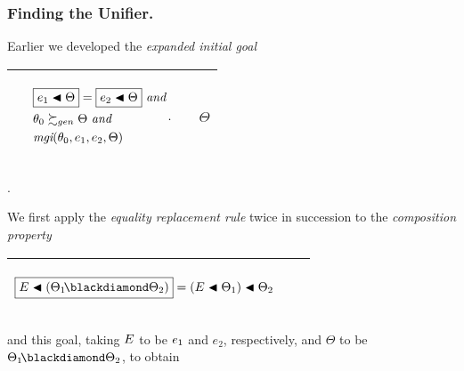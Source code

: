 \documentclass[runningheads]{llncs}
\DeclareMathOperator{\uand}{\emph{and}\,}
\DeclareMathOperator{\mgi}{\emph{mgi}}
\begin{document}
\subsubsection{Finding the Unifier.} Earlier we developed the \emph{expanded initial goal}
\begin{center}
\begin{tabular}{|m{}|m{}||m{}|}
 \hline 
  & 
  \begin{center}
${\begin{aligned} 
&\begin{aligned}
&\boxed{\e{1} \apply \Theta} = \boxed{\e{2} \apply \Theta} \, \uand 
 \\
 \,\, & \thet{0} \moregen \Theta \, \uand
\\
  \,\, & {\mgi}(\thet{0}, \e{1}, \e{2}, \Theta)
\end{aligned}.\end{aligned}}$\hspace{1cm} 
\end{center} & \begin{center}$\Theta$ \end{center} \\
\hline
\end{tabular}.
\end{center}
We first apply the \emph{equality replacement rule} twice in succession to the \emph{composition property}
\begin{center}
  \begin{tabular}{|m{}|m{}||m{}|}
\hline
\begin{center}
{$\begin{aligned}
\boxed{\var{E} \apply (\Thet{1}\! \compose \Thet{2})} = (\var{E} \apply \Thet{1}) \apply \Thet{2}
\end{aligned}$} \hspace{1cm} 
\end{center}& &  \\  \hline
\end{tabular}
\end{center}
and this goal, taking  $E$ to be $e_{1}$ and $e_2$, respectively, and $\Theta$ to be $\Thet{1}\! \compose \Thet{2}$, to obtain
\end{document}
